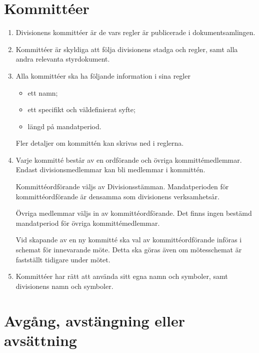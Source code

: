 \documentclass{dvd}
\begin{document}
	\section{Kommittéer}

	\begin{enumerate}[label=\arabic* §, ref=\arabic*]
		\item Divisionens kommittéer är de vars regler är publicerade i dokumentsamlingen.

		\item Kommittéer är skyldiga att följa divisionens stadga och regler, samt alla andra relevanta styrdokument.

		\item Alla kommittéer ska ha följande information i sina regler

		\begin{itemize}
			\item ett namn;

			\item ett specifikt och väldefinierat syfte;

			\item längd på mandatperiod.
		\end{itemize}

		Fler detaljer om kommittén kan skrivas ned i reglerna.

		\item Varje kommitté består av en ordförande och övriga kommittémedlemmar.
		Endast divisionsmedlemmar kan bli medlemmar i kommittén.

		Kommittéordförande väljs av Divisionsstämman.
		Mandatperioden för kommittéordförande är densamma som divisionens verksamhetsår.

		Övriga medlemmar väljs in av kommittéordförande.
		Det finns ingen bestämd mandatperiod för övriga kommittémedlemmar.

		Vid skapande av en ny kommitté ska val av kommittéordförande införas i schemat för innevarande möte.
		Detta ska göras även om mötesschemat är fastställt tidigare under mötet.

                \item Kommittéer har rätt att använda sitt egna namn och symboler, samt divisionens namn och symboler.
	\end{enumerate}

	\section{Avgång, avstängning eller avsättning}
\end{document}
